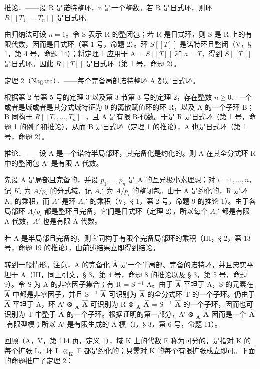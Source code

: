 推论．——设 R 是诺特整环，n 是一个整数。若 R 是日式环，则环 \(R[[T_{1}, \ldots, T_{n}]]\) 是日式环。

由归纳法可设 \(n = 1\)。令 S 表示 R 的整闭包；若 R 是日式环，则 S 是 R 上的有限代数，因而是日式环（第 1 号，命题 2）。环 \(S[[T]]\) 是诺特环且整闭（V，§ 1，第 4 号，命题 14）；将定理 1 应用于 A = \(S[[T]]\) 和 \(a = T\)，得到 \(S[[T]]\) 是日式环。因此 \(R[[T]]\) 是日式环（第 1 号，命题 2）。

定理 2（Nagata）．——每个完备局部诺特整环 A 都是日式环。

根据第 2 节第 5 号的定理 3 以及第 3 节第 3 号的定理 2，存在整数 \(n \geqslant 0\)、一个或者是域或者是其分式域特征为 0 的离散赋值环的环 R，以及 A 的一个子环 B；B 同构于 \(R[[T_{1}, \ldots, T_{n}]]\)，且 A 是有限 B-代数。于是 R 是日式环（第 1 号，命题 1 的例子和推论），从而 B 是日式环（定理 1 的推论），A 也是日式环（第 1 号，命题 2）。

推论．——设 A 是一个诺特半局部环，其完备化是约化的。则 A 在其全分式环 R 中的整闭包 A' 是有限 A-代数。

先设 A 是局部且完备的，并设 \(p_{1}, \ldots, p_{n}\) 是 A 的互异极小素理想；对 \(i = 1, \ldots, n\)，记 \(K_{i}\) 为 \(A/p_{i}\) 的分式域，记 \(A_{i}'\) 为 \(A/p_{i}\) 的整闭包。由于 A 是约化的，R 是环 \(K_{i}\) 的乘积，而 \(A'\) 是环 \(A_{i}'\) 的乘积（V，§ 1，第 2 号，命题 9 的推论 1）。由于各局部环 \(A/p_{i}\) 都是整环且完备，它们是日式环（定理 2），所以每个 \(A_{i}'\) 都是有限 A-代数，\(A'\) 也是有限 A-代数。

若 A 是半局部且完备的，则它同构于有限个完备局部环的乘积（III，§ 2，第 13 号，命题 19 的推论），由前述结果立即得到结论。

转到一般情形。注意，A 的完备化 \(\hat{\mathbf{A}}\) 是一个半局部、完备的诺特环，并且忠实平坦于 A（III，同上引文，§ 3，第 4 号，命题 8 的推论以及 § 3，第 5 号，命题 9）。令 S 为 A 的非零因子集合；有 R = S \(^{-1}\) A。由于 \(\hat{\mathbf{A}}\) 平坦于 A，S 的元素在 \(\hat{\mathbf{A}}\) 中都是非零因子，并且 S \(^{-1}\) \(\hat{\mathbf{A}}\) 可识别为 \(\hat{\mathbf{A}}\) 的全分式环 T 的一个子环。仍由于 \(\hat{\mathbf{A}}\) 平坦于 A，环 A′ ⊗ \(_{\mathbf{A}}\) \(\hat{\mathbf{A}}\) 可识别为 R ⊗ \(_{\mathbf{A}}\) \(\hat{\mathbf{A}}\) = S \(^{-1}\) \(\hat{\mathbf{A}}\) 的一个子环，因而也可识别为 T 中整于 \(\hat{\mathbf{A}}\) 的一个子环。根据证明的第一部分，A′ ⊗ \(_{\mathbf{A}}\) \(\hat{\mathbf{A}}\) 因而是一个 \(\hat{\mathbf{A}}\) -有限型模；所以 A′ 是有限生成的 A-模（I，§ 3，第 6 号，命题 11）。

回顾（A，V，第 114 页，定义 1），域 K 上的代数 E 称为可分的，是指对 K 的每个扩张 L，环 L \(\otimes_{\mathbf{K}}\) E 都是约化的；只需对 K 的每个有限扩张成立即可。下面的命题推广了定理 2：

